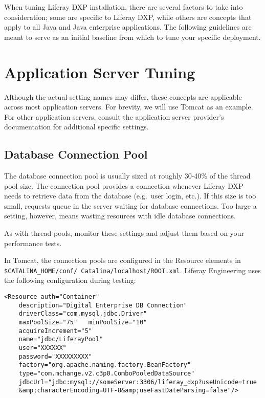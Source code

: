 When tuning Liferay DXP installation, there are several factors to take
into consideration; some are specific to Liferay DXP, while others are
concepts that apply to all Java and Java enterprise applications. The
following guidelines are meant to serve as an initial baseline from
which to tune your specific deployment.

\section{Application Server Tuning}\label{application-server-tuning}

Although the actual setting names may differ, these concepts are
applicable across most application servers. For brevity, we will use
Tomcat as an example. For other application servers, consult the
application server provider's documentation for additional specific
settings.

\subsection{Database Connection Pool}\label{database-connection-pool}

The database connection pool is usually sized at roughly 30-40\% of the
thread pool size. The connection pool provides a connection whenever
Liferay DXP needs to retrieve data from the database (e.g.~user login,
etc.). If this size is too small, requests queue in the server waiting
for database connections. Too large a setting, however, means wasting
resources with idle database connections.

As with thread pools, monitor these settings and adjust them based on
your performance tests.

In Tomcat, the connection pools are configured in the Resource elements
in \texttt{\$CATALINA\_HOME/conf/\ Catalina/localhost/ROOT.xml}. Liferay
Engineering uses the following configuration during testing:

\begin{verbatim}
<Resource auth="Container"         
    description="Digital Enterprise DB Connection"   
    driverClass="com.mysql.jdbc.Driver"   
    maxPoolSize="75"   minPoolSize="10"           
    acquireIncrement="5"   
    name="jdbc/LiferayPool"  
    user="XXXXXX"   
    password="XXXXXXXXX"           
    factory="org.apache.naming.factory.BeanFactory"
    type="com.mchange.v2.c3p0.ComboPooledDataSource"
    jdbcUrl="jdbc:mysql://someServer:3306/liferay_dxp?useUnicode=true
    &amp;characterEncoding=UTF-8&amp;useFastDateParsing=false"/>
\end{verbatim}

